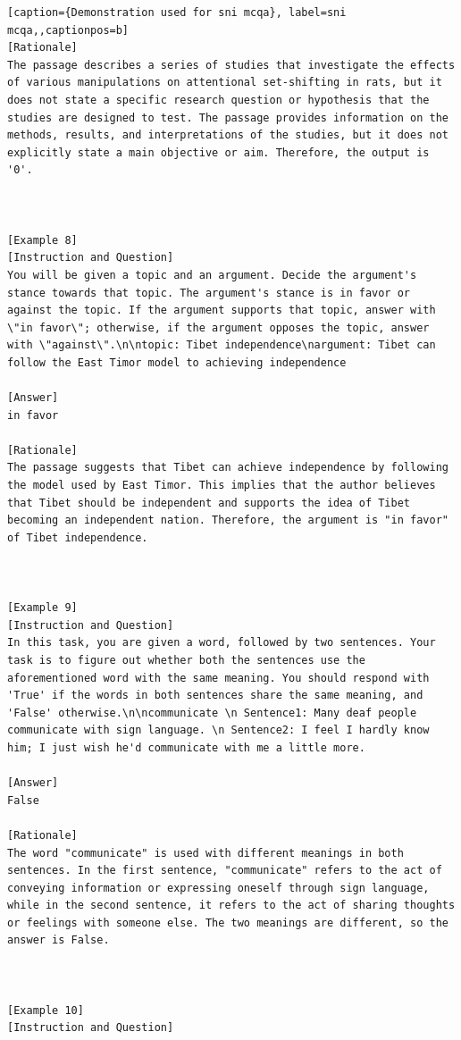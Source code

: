 \begin{lstlisting}[caption={Demonstration used for sni mcqa}, label=sni mcqa,,captionpos=b]
[Rationale]
The passage describes a series of studies that investigate the effects of various manipulations on attentional set-shifting in rats, but it does not state a specific research question or hypothesis that the studies are designed to test. The passage provides information on the methods, results, and interpretations of the studies, but it does not explicitly state a main objective or aim. Therefore, the output is '0'.



[Example 8]
[Instruction and Question]
You will be given a topic and an argument. Decide the argument's stance towards that topic. The argument's stance is in favor or against the topic. If the argument supports that topic, answer with \"in favor\"; otherwise, if the argument opposes the topic, answer with \"against\".\n\ntopic: Tibet independence\nargument: Tibet can follow the East Timor model to achieving independence

[Answer]
in favor

[Rationale]
The passage suggests that Tibet can achieve independence by following the model used by East Timor. This implies that the author believes that Tibet should be independent and supports the idea of Tibet becoming an independent nation. Therefore, the argument is "in favor" of Tibet independence.



[Example 9]
[Instruction and Question]
In this task, you are given a word, followed by two sentences. Your task is to figure out whether both the sentences use the aforementioned word with the same meaning. You should respond with 'True' if the words in both sentences share the same meaning, and 'False' otherwise.\n\ncommunicate \n Sentence1: Many deaf people communicate with sign language. \n Sentence2: I feel I hardly know him; I just wish he'd communicate with me a little more.

[Answer]
False

[Rationale]
The word "communicate" is used with different meanings in both sentences. In the first sentence, "communicate" refers to the act of conveying information or expressing oneself through sign language, while in the second sentence, it refers to the act of sharing thoughts or feelings with someone else. The two meanings are different, so the answer is False.



[Example 10]
[Instruction and Question]

    \end{lstlisting}
    





